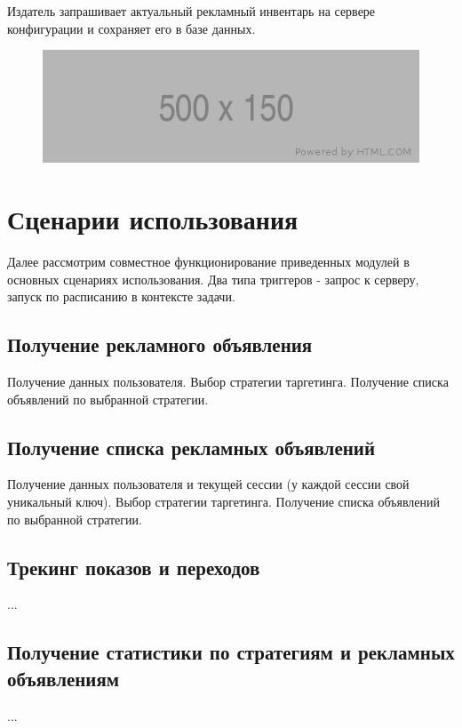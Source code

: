 \documentclass[times]{itmo-student-thesis}
\begin{document}
Издатель запрашивает актуальный рекламный инвентарь на сервере конфигурации и сохраняет его в базе данных.

\begin{figure}[h]
\includegraphics[width=\textwidth]{placeholder}
\centering
\end{figure}

\section{Сценарии использования}

Далее рассмотрим совместное функционирование приведенных модулей в основных сценариях использования.
Два типа триггеров - запрос к серверу, запуск по расписанию в контексте задачи.

\subsection{Получение рекламного объявления}
Получение данных пользователя. 
Выбор стратегии таргетинга. 
Получение списка объявлений по выбранной стратегии.

\subsection{Получение списка рекламных объявлений}
Получение данных пользователя и текущей сессии (у каждой сессии свой уникальный ключ). 
Выбор стратегии таргетинга. 
Получение списка объявлений по выбранной стратегии.

\subsection{Трекинг показов и переходов}
...

\subsection{Получение статистики по стратегиям и рекламных объявлениям}
...

\chapterconclusion
\end{document}
